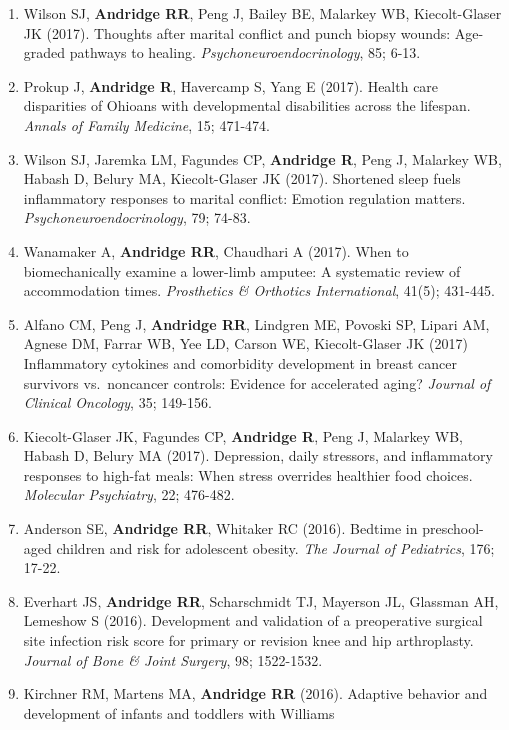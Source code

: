 \documentclass[
  english,
  letterpaper,
  DIV=11,
  numbers=noendperiod]{scrartcl}
\begin{document}
\begin{enumerate}
  of treatment response of the Hunter Heartbeat Method.
  \emph{AUTISM-Open Access}, 7: 222.
\item
  Wilson SJ, \textbf{Andridge RR}, Peng J, Bailey BE, Malarkey WB,
  Kiecolt-Glaser JK (2017). Thoughts after marital conflict and punch
  biopsy wounds: Age-graded pathways to healing.
  \emph{Psychoneuroendocrinology}, 85; 6-13.
\item
  Prokup J, \textbf{Andridge R}, Havercamp S, Yang E (2017). Health care
  disparities of Ohioans with developmental disabilities across the
  lifespan. \emph{Annals of Family Medicine}, 15; 471-474.
\item
  Wilson SJ, Jaremka LM, Fagundes CP, \textbf{Andridge R}, Peng J,
  Malarkey WB, Habash D, Belury MA, Kiecolt-Glaser JK (2017). Shortened
  sleep fuels inflammatory responses to marital conflict: Emotion
  regulation matters. \emph{Psychoneuroendocrinology}, 79; 74-83.
\item
  Wanamaker A, \textbf{Andridge RR}, Chaudhari A (2017). When to
  biomechanically examine a lower-limb amputee: A systematic review of
  accommodation times. \emph{Prosthetics \& Orthotics International},
  41(5); 431-445.
\item
  Alfano CM, Peng J, \textbf{Andridge RR}, Lindgren ME, Povoski SP,
  Lipari AM, Agnese DM, Farrar WB, Yee LD, Carson WE, Kiecolt-Glaser JK
  (2017) Inflammatory cytokines and comorbidity development in breast
  cancer survivors vs.~noncancer controls: Evidence for accelerated
  aging? \emph{Journal of Clinical Oncology}, 35; 149-156.
\item
  Kiecolt-Glaser JK, Fagundes CP, \textbf{Andridge R}, Peng J, Malarkey
  WB, Habash D, Belury MA (2017). Depression, daily stressors, and
  inflammatory responses to high-fat meals: When stress overrides
  healthier food choices. \emph{Molecular Psychiatry}, 22; 476-482.
\item
  Anderson SE, \textbf{Andridge RR}, Whitaker RC (2016). Bedtime in
  preschool-aged children and risk for adolescent obesity. \emph{The
  Journal of Pediatrics}, 176; 17-22.
\item
  Everhart JS, \textbf{Andridge RR}, Scharschmidt TJ, Mayerson JL,
  Glassman AH, Lemeshow S (2016). Development and validation of a
  preoperative surgical site infection risk score for primary or
  revision knee and hip arthroplasty. \emph{Journal of Bone \& Joint
  Surgery}, 98; 1522-1532.
\item
  Kirchner RM, Martens MA, \textbf{Andridge RR} (2016). Adaptive
  behavior and development of infants and toddlers with Williams

\end{enumerate}
\end{document}

